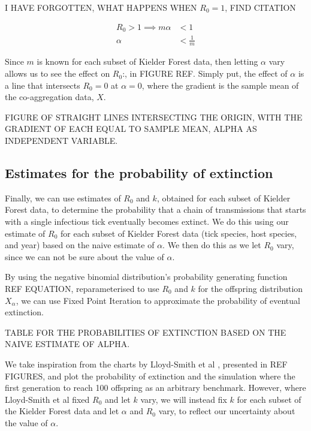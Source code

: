 \documentclass{article}
\begin{document}
I HAVE FORGOTTEN, WHAT HAPPENS WHEN $ R_0 = 1 $, FIND CITATION

\begin{align}
	R_0 > 1 \implies m\alpha &< 1 \nonumber \\
					  \alpha &< \frac{1}{m}
\end{align}

Since $ m $ is known for each subset of Kielder Forest data, then letting $ \alpha $ vary allows us to see the effect on $ R_0 $:, in FIGURE REF. Simply put, the effect of $ \alpha $ is a line that intersects $ R_0 = 0 $ at $ \alpha = 0 $, where the gradient is the sample mean of the co-aggregation data, $ X $.

FIGURE OF STRAIGHT LINES INTERSECTING THE ORIGIN, WITH THE GRADIENT OF EACH EQUAL TO SAMPLE MEAN, ALPHA AS INDEPENDENT VARIABLE.

\subsection{Estimates for the probability of extinction}

Finally, we can use estimates of $ R_0 $ and $ k $, obtained for each subset of Kielder Forest data, to determine the probability that a chain of transmissions that starts with a single infectious tick eventually becomes extinct. We do this using our estimate of $ R_0 $ for each subset of Kielder Forest data (tick species, host species, and year) based on the naive estimate of $ \alpha $. We then do this as we let $ R_0 $ vary, since we can not be sure about the value of $ \alpha $.

By using the negative binomial distribution's probability generating function REF EQUATION, reparameterised to use $ R_0 $ and $ k $ for the offspring distribution $ X_{\alpha} $, we can use Fixed Point Iteration to approximate the probability of eventual extinction.

TABLE FOR THE PROBABILITIES OF EXTINCTION BASED ON THE NAIVE ESTIMATE OF ALPHA.

We take inspiration from the charts by Lloyd-Smith et al \cite{LloydSmith2005}, presented in REF FIGURES, and plot the probability of extinction and the simulation where the first generation to reach 100 offspring as an arbitrary benchmark. However, where Lloyd-Smith et al fixed $ R_0 $ and let $ k $ vary, we will instead fix $ k $ for each subset of the Kielder Forest data and let $ \alpha $ and $ R_0 $ vary, to reflect our uncertainty about the value of $ \alpha $.
\end{document}

